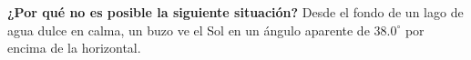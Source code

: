 \item \textbf{¿Por qué no es posible la siguiente situación?}
Desde el fondo de un lago de agua dulce en calma, un buzo ve el Sol en un ángulo aparente de $38.0^\circ$ por encima de la horizontal.